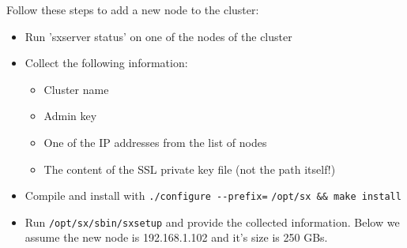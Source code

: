 Follow these steps to add a new node to the cluster:
\begin{itemize}
    \item Run 'sxserver status' on one of the nodes of the cluster
    \item Collect the following information:
	\begin{itemize}
	    \item Cluster name
	    \item Admin key
	    \item One of the IP addresses from the list of nodes
	    \item The content of the SSL private key file (not the path itself!)
	\end{itemize}
    \item Compile and install \SX with \verb+./configure --prefix=+
	  \verb+/opt/sx && make install+
    \item Run \verb+/opt/sx/sbin/sxsetup+ and provide the collected information.
	  Below we assume the new node is
	  192.168.1.102 and it's size is 250 GBs.
\end{itemize}

